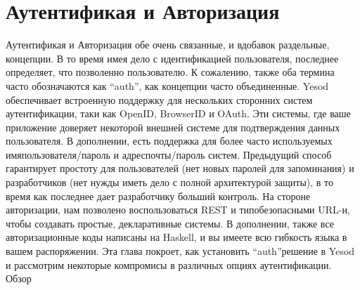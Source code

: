 \chapter{Аутентификая и Авторизация}\label{chap:auth}

Аутентификая и Авторизация обе очень связанные, и вдобавок раздельные, концепции. В то время имея дело с идентификацией пользователя, последнее определяет, что позволенно пользователю. К сожалению, также оба термина часто обозначаются как \textquotedblleft auth\textquotedblright, как концепции часто объединенные.
Yesod обеспечивает встроенную поддержку для нескольких сторонних систем аутентификации, таки как OpenID, BrowserID и OAuth. Эти системы, где ваше приложение доверяет некоторой внешней системе для подтверждения данных пользователя. В дополнении, есть поддержка для более часто используемых имяпользователя/пароль и адреспочты/пароль систем. Предыдущий способ гарантирует простоту для пользователей (нет новых паролей для запоминания) и разработчиков (нет нужды иметь дело с полной архитектурой защиты), в то время как последнее дает разработчику больший контроль.
На стороне авторизации, нам позволено воспользоваться REST и типобезопасными URL-и, чтобы создавать простые, декларативные системы. В дополнении, также все авторизационные коды написаны на Haskell, и вы имеете всю гибкость языка в вашем распоряжении.
Эта глава покроет, как установить \textquotedblleft auth\textquotedblright решение в Yesod и рассмотрим некоторые компромисы в различных опциях аутентификации.
Обзор

